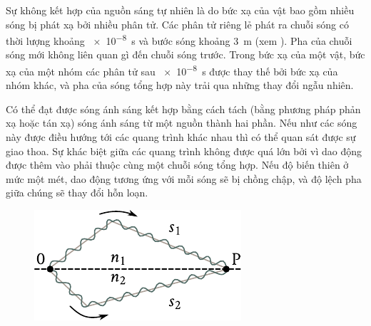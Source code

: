 Sự không kết hợp của nguồn sáng tự nhiên là do bức xạ của vật bao gồm nhiều sóng bị phát xạ bởi nhiều phân tử.
Các phân tử riêng lẻ phát ra chuỗi sóng có thời lượng khoảng \SI{e-8}{\second} và bước sóng khoảng \SI{3}{\metre} (xem ).
Pha của chuỗi sóng mới không liên quan gì đến chuỗi sóng trước.
Trong bức xạ của một vật, bức xạ của một nhóm các phân tử sau \SI{e-8}{\second} được thay thế bởi bức xạ của nhóm khác, và pha của sóng tổng hợp này trải qua những thay đổi ngẫu nhiên.

Có thể đạt được sóng ánh sáng kết hợp bằng cách tách (bằng phương pháp phản xạ hoặc tán xạ) sóng ánh sáng từ một nguồn thành hai phần.
Nếu như các sóng này được điều hướng tới các quang trình khác nhau thì có thể quan sát được sự giao thoa.
Sự khác biệt giữa các quang trình không được quá lớn bởi vì dao động được thêm vào phải thuộc cùng một chuỗi sóng tổng hợp.
Nếu độ biến thiên ở mức một mét, dao động tương ứng với mỗi sóng sẽ bị chồng chập, và độ lệch pha giữa chúng sẽ thay đổi hỗn loạn.

\begin{figure}[!htb]
	\begin{center}
		\includegraphics[scale=1]{figures/ch_17/fig_17_1.pdf}
		\caption[]{}
		\label{fig:17_1}
	\end{center}
	\vspace{-0.8cm}
\end{figure}

